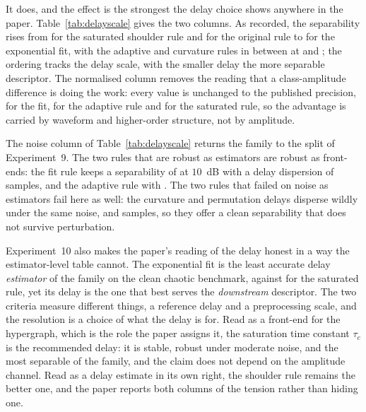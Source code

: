 \documentclass[10pt,a4paper,twocolumn]{article}
\begin{document}
It does, and the effect is the strongest the delay choice shows anywhere in the
paper.  Table~\ref{tab:delayscale} gives the two columns.  As recorded, the
separability rises from \sepCleanLPF{} for the saturated shoulder rule and
\sepCleanSE{} for the original rule to \sepCleanFIT{} for the exponential fit,
with the adaptive and curvature rules in between at \sepCleanADP{} and
\sepCleanCURV{}; the ordering tracks the delay scale, with the smaller delay
the more separable descriptor.  The normalised column removes the reading that
a class-amplitude difference is doing the work: every value is unchanged to the
published precision, \sepNormFIT{} for the fit, \sepNormADP{} for the adaptive
rule and \sepNormLPF{} for the saturated rule, so the advantage is carried by
waveform and higher-order structure, not by amplitude.

The noise column of Table~\ref{tab:delayscale} returns the family to the split
of Experiment~9.  The two rules that are robust as estimators are robust as
front-ends: the fit rule keeps a separability of \sepTenFIT{} at $10$~dB with a
delay dispersion of \sepDispTenFIT{} samples, and the adaptive rule
\sepTenADP{} with \sepDispTenADP{}.  The two rules that failed on noise as
estimators fail here as well: the curvature and permutation delays disperse
wildly under the same noise, \sepDispTenCURV{} and \sepDispTenPE{} samples, so
they offer a clean separability that does not survive perturbation.

Experiment~10 also makes the paper's reading of the delay honest in a way the
estimator-level table cannot.  The exponential fit is the least accurate delay
\emph{estimator} of the family on the clean chaotic benchmark, \varTauFIT{}
against \varTauLPF{} for the saturated rule, yet its delay is the one that best
serves the \emph{downstream} descriptor.  The two criteria measure different
things, a reference delay and a preprocessing scale, and the resolution is a
choice of what the delay is for.  Read as a front-end for the hypergraph, which
is the role the paper assigns it, the saturation time constant $\tau_c$ is the
recommended delay: it is stable, robust under moderate noise, and the most
separable of the family, and the claim does not depend on the amplitude
channel.  Read as a delay estimate in its own right, the shoulder rule remains
the better one, and the paper reports both columns of the tension rather than
hiding one.
\end{document}
